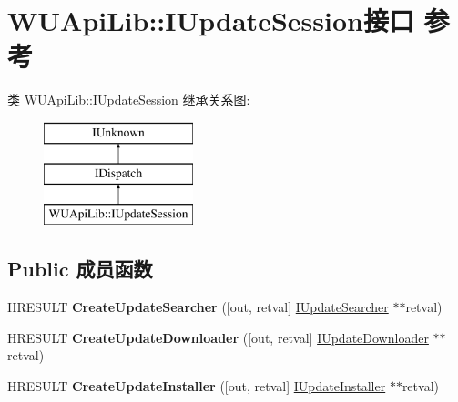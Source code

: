 \hypertarget{interface_w_u_api_lib_1_1_i_update_session}{}\section{W\+U\+Api\+Lib\+:\+:I\+Update\+Session接口 参考}
\label{interface_w_u_api_lib_1_1_i_update_session}
类 W\+U\+Api\+Lib\+:\+:I\+Update\+Session 继承关系图\+:\begin{figure}[H]
\begin{center}
\leavevmode
\includegraphics[height=3.000000cm]{interface_w_u_api_lib_1_1_i_update_session}
\end{center}
\end{figure}
\subsection*{Public 成员函数}
\begin{DoxyCompactItemize}
\item 
\mbox{\label{interface_w_u_api_lib_1_1_i_update_session_a56ae7452e181f7c145a6baa4b34fa1e5}} 
H\+R\+E\+S\+U\+LT {\bfseries Create\+Update\+Searcher} (\mbox{[}out, retval\mbox{]} \hyperlink{interface_w_u_api_lib_1_1_i_update_searcher}{I\+Update\+Searcher} $\ast$$\ast$retval)
\item 
\mbox{\label{interface_w_u_api_lib_1_1_i_update_session_a2ba8bb31bc95fa1de0c9beefc27d3fa6}} 
H\+R\+E\+S\+U\+LT {\bfseries Create\+Update\+Downloader} (\mbox{[}out, retval\mbox{]} \hyperlink{interface_w_u_api_lib_1_1_i_update_downloader}{I\+Update\+Downloader} $\ast$$\ast$retval)
\item 
\mbox{\label{interface_w_u_api_lib_1_1_i_update_session_ab322eabff5f694e35943452614ad3093}} 
H\+R\+E\+S\+U\+LT {\bfseries Create\+Update\+Installer} (\mbox{[}out, retval\mbox{]} \hyperlink{interface_w_u_api_lib_1_1_i_update_installer}{I\+Update\+Installer} $\ast$$\ast$retval)
\end{DoxyCompactItemize}
